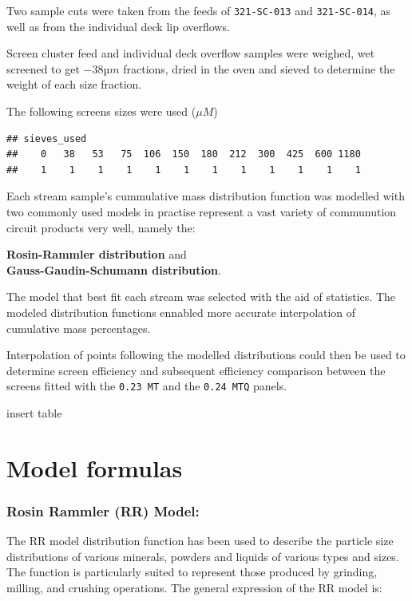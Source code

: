 \documentclass[
]{article}
\begin{document}
Two sample cuts were taken from the feeds of \texttt{321-SC-013} and
\texttt{321-SC-014}, as well as from the individual deck lip overflows.

Screen cluster feed and individual deck overflow samples were weighed,
wet screened to get \(-38 µm\) fractions, dried in the oven and sieved
to determine the weight of each size fraction.

The following screens sizes were used (\(\mu M\))

\begin{verbatim}
## sieves_used
##    0   38   53   75  106  150  180  212  300  425  600 1180 
##    1    1    1    1    1    1    1    1    1    1    1    1
\end{verbatim}

Each stream sample's cummulative mass distribution function was modelled
with two commonly used models in practise represent a vast variety of
communution circuit products very well, namely the:

\textbf{Rosin-Rammler distribution} and\\
\textbf{Gauss-Gaudin-Schumann distribution}.

The model that best fit each stream was selected with the aid of
statistics. The modeled distribution functions ennabled more accurate
interpolation of cumulative mass percentages.

Interpolation of points following the modelled distributions could then
be used to determine screen efficiency and subsequent efficiency
comparison between the screens fitted with the \texttt{0.23\ MT} and the
\texttt{0.24\ MTQ} panels.

insert table

\hypertarget{model-formulas}{%
\section{Model formulas}\label{model-formulas}}

\hypertarget{rosin-rammler-rr-model}{%
\subsubsection{Rosin Rammler (RR) Model:}\label{rosin-rammler-rr-model}}

The RR model distribution function has been used to describe the
particle size distributions of various minerals, powders and liquids of
various types and sizes. The function is particularly suited to
represent those produced by grinding, milling, and crushing operations.
The general expression of the RR model is:
\end{document}
